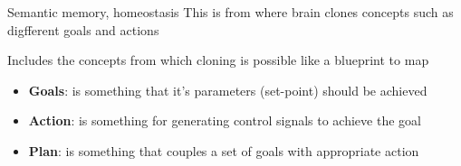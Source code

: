 \begin{frame}{Semantic memory, homeostasis}
    This is from where brain clones concepts such as digfferent goals and actions
    
    Includes the concepts from which cloning is possible like a blueprint to map
    \begin{itemize}
        \item \textbf{Goals}: is something that it's parameters (set-point) should be achieved
        \item \textbf{Action}: is something for generating control signals to achieve the goal
        \item \textbf{Plan}: is something that couples a set of goals with appropriate action
    \end{itemize}

\end{frame}